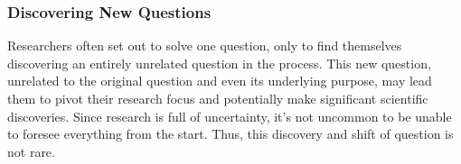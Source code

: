 




\subsubsection{Discovering New Questions}
Researchers often set out to solve one question, only to find themselves discovering an entirely unrelated question in the process. This new question, unrelated to the original question and even its underlying purpose, may lead them to pivot their research focus and potentially make significant scientific discoveries. Since research is full of uncertainty, it's not uncommon to be unable to foresee everything from the start. Thus, this discovery and shift of question is not rare.

